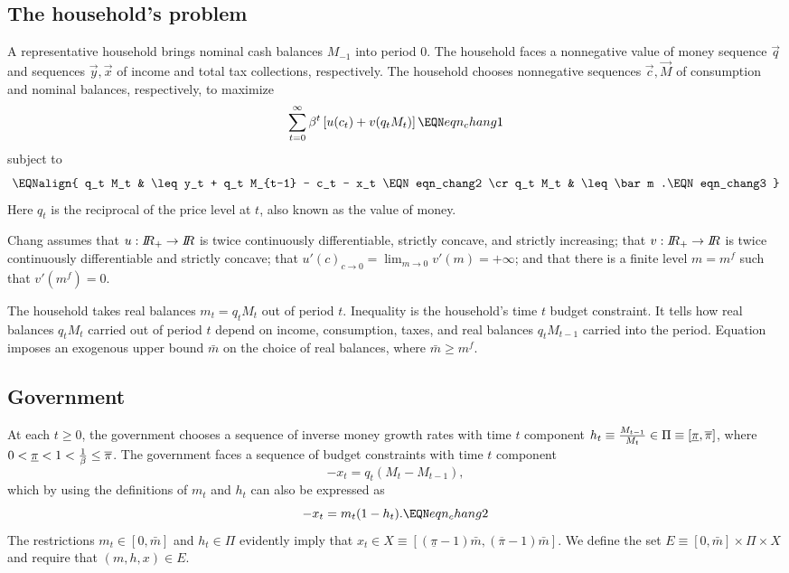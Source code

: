 \subsection{The household's problem}
A representative household
 brings nominal cash balances $M_{-1}$ into period $0$.
The household  faces a nonnegative value of money sequence $\vec q$ and sequences $\vec y, \vec x$ of income and total tax collections, respectively.
The household  chooses nonnegative sequences $\vec c, \vec M$ of consumption and nominal balances, respectively, to maximize
$$ \sum_{t=0}^\infty \beta^t \left[ u(c_t) + v(q_t M_t ) \right] \EQN eqn_chang1 $$
subject to
$$ \EQNalign{ q_t M_t & \leq y_t + q_t M_{t-1} - c_t - x_t \EQN eqn_chang2 \cr
              q_t M_t & \leq \bar m .\EQN eqn_chang3 } $$
Here $q_t$ is the reciprocal of the price level at $t$, also known as  the value of money.


Chang assumes that $u: {{I\kern-0.3em R}}_+ \rightarrow {{I\kern-0.3em R}} $ is twice continuously differentiable, strictly concave, and strictly increasing;
that $v: {{I\kern-0.3em R}}_+ \rightarrow {{I\kern-0.3em R}}$ is twice continuously differentiable and strictly concave; that $u'(c)_{c \rightarrow 0}  =
\lim_{m \rightarrow 0} v'(m) = +\infty$; and that there is a finite level $m= m^f$ such that $v'(m^f) =0 $.


The household takes real balances   $m_t = q_t M_t$ out of period $t$. Inequality  is the household's time $t$ budget constraint. It tells how real balances $q_t M_t$ carried out of period $t$ depend
on income, consumption, taxes, and real balances $q_t M_{t-1}$ carried into the period. Equation
 imposes an exogenous upper  bound $\bar m$  on the choice of real balances, where $\bar m \geq m^f$.




\subsection{Government}
At  each $t \geq 0$, the government  chooses a sequence of inverse money growth rates with time $t$ component $h_t \equiv {M_{t-1}\over M_t} \in \Pi \equiv
[ \underline \pi, \overline \pi]$, where $0 < \underline \pi < 1 < { 1 \over \beta } \leq \overline \pi$.
The government faces a sequence of budget constraints with time $t$ component
$$ - x_t = q_t (M_t - M_{t-1}) ,  $$
which by using the definitions of $m_t$ and $h_t$ can also be expressed as
$$ - x_t = m_t (1-h_t).  \EQN eqn_chang2 $$
The  restrictions $m_t \in [0, \bar m]$ and $h_t \in \Pi$ evidently imply
that $x_t \in X \equiv [(\underline  \pi -1)\bar m, (\overline \pi -1) \bar m]$.
We define the set $E \equiv [0,\bar m] \times \Pi \times X$ and require that $(m, h, x) \in E$.


